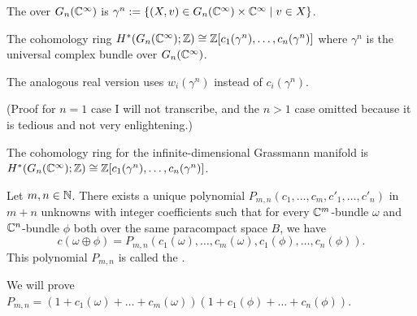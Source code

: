 \begin{definition}
The  over $G_{n}(\mathbb{C}^{\infty})$
is $\gamma^{n}:=\{(X,v)\in G_{n}(\mathbb{C}^{\infty})\times\mathbb{C}^{\infty}\mid v\in X\}$.
\end{definition}

\begin{theorem}
The cohomology ring $H^{*}(G_{n}(\mathbb{C}^{\infty});\mathbb{Z})\cong\mathbb{Z}[c_{1}(\gamma^{n}),\dots,c_{n}(\gamma^{n})]$
where $\gamma^{n}$ is the universal complex bundle over $G_{n}(\mathbb{C}^{\infty})$.
\end{theorem}

\begin{remark}
The analogous real version uses $w_{i}(\gamma^{n})$ instead of $c_{i}(\gamma^{n})$.
\end{remark}

(Proof for $n=1$ case I will not transcribe, and the $n>1$ case
omitted because it is tedious and not very enlightening.)

\begin{fact}
The cohomology ring for the infinite-dimensional Grassmann manifold is
$H^{*}(G_{n}(\mathbb{C}^{\infty});\mathbb{Z})\cong\mathbb{Z}[c_{1}(\gamma^{n}),\dots,c_{n}(\gamma^{n})]$.
\end{fact}

\begin{lemma}
Let $m,n\in\mathbb{N}$.
There exists a unique polynomial $P_{m,n}(c_{1},\dots,c_{m},c'_{1},\dots,c'_{n})$
in $m+n$ unknowns with integer coefficients such that for 
every $\mathbb{C}^{m}$-bundle $\omega$ and $\mathbb{C}^{n}$-bundle $\phi$ both over
the same paracompact space $B$, we have
\begin{equation}
c(\omega\oplus\phi)=P_{m,n}(c_{1}(\omega),\dots,c_{m}(\omega),c_{1}(\phi),\dots,c_{n}(\phi)).
\end{equation}
This polynomial $P_{m,n}$ is called the .
\end{lemma}

We will prove $P_{m,n}=(1+c_{1}(\omega)+\dots+c_{m}(\omega))(1+c_{1}(\phi)+\dots+c_{n}(\phi))$.